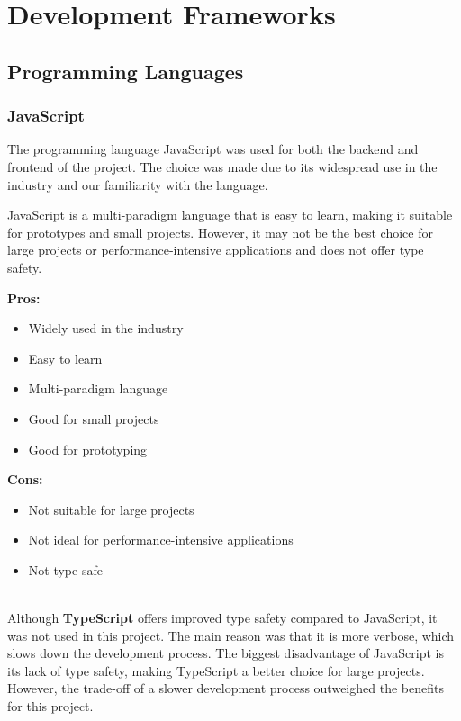 \section{Development Frameworks}

\subsection{Programming Languages}

\subsubsection{JavaScript}

The programming language JavaScript was used for both the backend and frontend of the project. The choice was made due to its widespread use in the industry and our familiarity with the language.

JavaScript is a multi-paradigm language that is easy to learn, making it suitable for prototypes and small projects. However, it may not be the best choice for large projects or performance-intensive applications and does not offer type safety.

\textbf{Pros:}
\begin{itemize}
    \item Widely used in the industry
    \item Easy to learn
    \item Multi-paradigm language
    \item Good for small projects
    \item Good for prototyping
\end{itemize}

\textbf{Cons:}
\begin{itemize}
    \item Not suitable for large projects
    \item Not ideal for performance-intensive applications
    \item Not type-safe
\end{itemize}

\hfill \\
Although \textbf{TypeScript} offers improved type safety compared to JavaScript, it was not used in this project. The main reason was that it is more verbose, which slows down the development process.
The biggest disadvantage of JavaScript is its lack of type safety, making TypeScript a better choice for large projects. However, the trade-off of a slower development process outweighed the benefits for this project.

